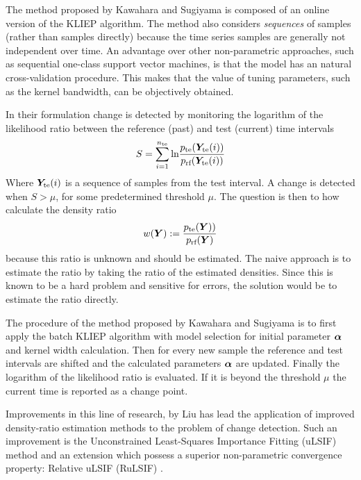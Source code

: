 The method proposed by Kawahara and Sugiyama \cite{kawahara2009change} is composed of an online version of the KLIEP algorithm.
The method also considers \emph{sequences} of samples (rather than samples directly) because the time series samples are generally not independent over time.
An advantage over other non-parametric approaches, such as sequential one-class support vector machines, is that the model has an natural cross-validation procedure.
This makes that the value of tuning parameters, such as the kernel bandwidth, can be objectively obtained.

In their formulation change is detected by monitoring the logarithm of the likelihood ratio between the reference (past) and test (current) time intervals
\begin{equation}
  S = \sum_{i=1}^{n_\text{te}} \text{ln} \frac{p_{\text{te}}(\matrixsym{Y}_\text{te}(i))}{p_\text{rf}(\matrixsym{Y}_\text{te}(i))}
\end{equation}
Where $\matrixsym{Y}_\text{te}(i)$ is a sequence of samples from the test interval.
A change is detected when $S > \mu$, for some predetermined threshold $\mu$.
The question is then to how calculate the density ratio
\begin{equation}
  w(\matrixsym{Y}) := \frac{p_\text{te}(\matrixsym{Y)})}{p_\text{rf}(\matrixsym{Y})}
\end{equation}
because this ratio is unknown and should be estimated.
The naive approach is to estimate the ratio by taking the ratio of the estimated densities.
Since this is known to be a hard problem and sensitive for errors, the solution would be to estimate the ratio directly.

The procedure of the method proposed by Kawahara and Sugiyama \cite{kawahara2009change} is to first apply the batch KLIEP algorithm with model selection for initial parameter $\vectorsym{\alpha}$ and kernel width calculation.
Then for every new sample the reference and test intervals are shifted and the calculated parameters $\vectorsym{\alpha}$ are updated.
Finally the logarithm of the likelihood ratio is evaluated.
If it is beyond the threshold $\mu$ the current time is reported as a change point.

Improvements in this line of research, by Liu \etal \cite{liu2013change} has lead the application of improved density-ratio estimation methods to the problem of change detection.
Such an improvement is the Unconstrained Least-Squares Importance Fitting (uLSIF) method \cite{kanamori2009least} and an extension which possess a superior non-parametric convergence property: Relative uLSIF (RuLSIF) \cite{yamada2013relative}.